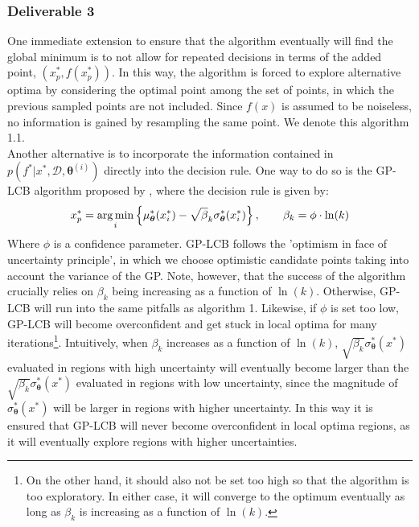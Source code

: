 \subsubsection*{Deliverable 3}
One immediate extension to ensure that the algorithm eventually will find the global minimum is to not allow for repeated decisions in terms of the added point, $(x_p^*, f(x_p^*))$. In this way, the algorithm is forced to explore alternative optima by considering the optimal point among the set of points, in which the previous sampled points are not included. Since $f(x)$ is assumed to be noiseless, no information is gained by resampling the same point. We denote this algorithm 1.1.\\
Another alternative is to incorporate the information contained in $p(f^*|x^*,\mathcal{D},\bm{\theta}^{(i)})$ directly into the decision rule. One way to do so is the GP-LCB algorithm proposed by \cite{Srinivas_2012}, where the decision rule is given by:
\begin{equation}
    x_p^* = \operatorname*{arg\,min}_i \left\{ \mu_{\bm{\theta}}^*(x_i^*) - \sqrt{\beta}_k \sigma_{\bm{\theta}}^*(x_i^*)\right\}, \qquad \beta_k = \phi\cdot\ln(k)
\end{equation}
Where $\phi$ is a confidence parameter. GP-LCB follows the 'optimism in face of uncertainty principle', in which we choose optimistic candidate points taking into account the variance of the GP. Note, however, that the success of the algorithm crucially relies on $\beta_k$ being increasing as a function of $\ln(k)$. Otherwise, GP-LCB will run into the same pitfalls as algorithm 1. Likewise, if $\phi$ is set too low, GP-LCB will become overconfident and get stuck in local optima for many iterations\footnote{On the other hand, it should also not be set too high so that the algorithm is too exploratory. In either case, it will converge to the optimum eventually as long as $\beta_k$ is increasing as a function of $\ln(k)$.}. Intuitively, when $\beta_k$ increases as a function of $\ln(k)$, $\sqrt{\beta_k}\sigma_{\bm{\theta}}^*(x^*)$ evaluated in regions with high uncertainty will eventually become larger than the $\sqrt{\beta_k}\sigma_{\bm{\theta}}^*(x^*)$ evaluated in regions with low uncertainty, since the magnitude of $\sigma_{\bm{\theta}}^*(x^*)$ will be larger in regions with higher uncertainty. In this way it is ensured that GP-LCB will never become overconfident in local optima regions, as it will eventually explore regions with higher uncertainties.\\
